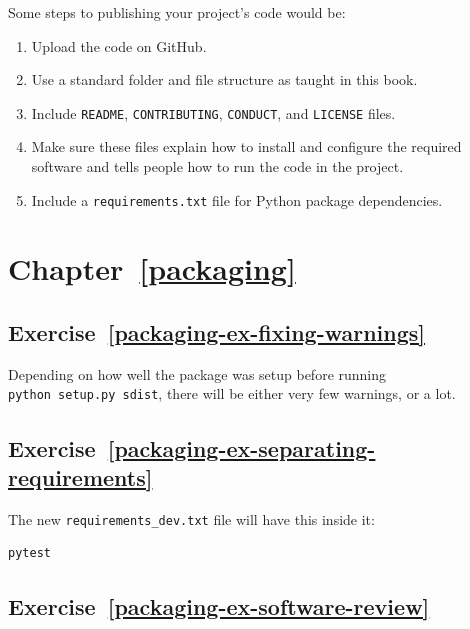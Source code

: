 \documentclass[
]{krantz}
\providecommand{\tightlist}{%
  \setlength{\itemsep}{0pt}\setlength{\parskip}{0pt}}
\begin{document}
Some steps to publishing your project's code would be:

\begin{enumerate}
\def\labelenumi{\arabic{enumi}.}
\tightlist
\item
  Upload the code on GitHub.
\item
  Use a standard folder and file structure as taught in this book.
\item
  Include \texttt{README}, \texttt{CONTRIBUTING}, \texttt{CONDUCT}, and \texttt{LICENSE} files.
\item
  Make sure these files explain how to install and configure the required software
  and tells people how to run the code in the project.
\item
  Include a \texttt{requirements.txt} file for Python package dependencies.
\end{enumerate}

\hypertarget{chapter-refpackaging}{%
\section*{Chapter~\ref{packaging}}\label{chapter-refpackaging}}

\hypertarget{exercise-refpackaging-ex-fixing-warnings}{%
\subsection*{Exercise~\ref{packaging-ex-fixing-warnings}}\label{exercise-refpackaging-ex-fixing-warnings}}


Depending on how well the package was setup before running \texttt{python\ setup.py\ sdist},
there will be either very few warnings, or a lot.

\hypertarget{exercise-refpackaging-ex-separating-requirements}{%
\subsection*{Exercise~\ref{packaging-ex-separating-requirements}}\label{exercise-refpackaging-ex-separating-requirements}}


The new \texttt{requirements\_dev.txt} file will have this inside it:

\begin{verbatim}
pytest
\end{verbatim}

\hypertarget{exercise-refpackaging-ex-software-review}{%
\subsection*{Exercise~\ref{packaging-ex-software-review}}\label{exercise-refpackaging-ex-software-review}}
\end{document}
